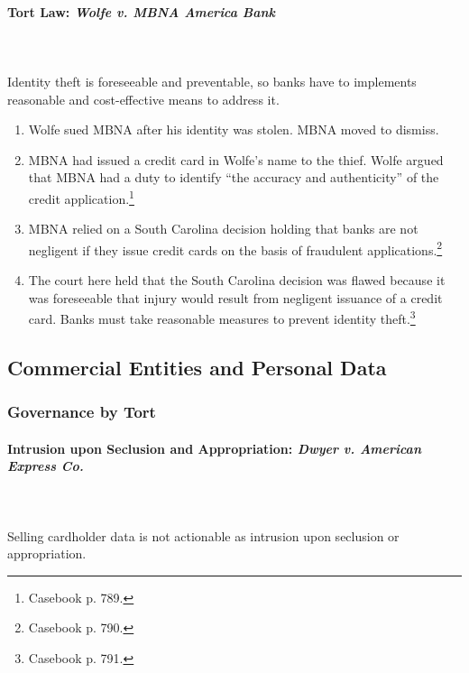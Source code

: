 \newpage %

\paragraph{Tort Law: \emph{Wolfe v. MBNA America Bank}}
~\\\\
Identity theft is foreseeable and preventable, so banks have to implements 
reasonable and cost-effective means to address it.

\begin{enumerate}
    \item Wolfe sued MBNA after his identity was stolen. MBNA moved to dismiss.
    \item MBNA had issued a credit card in Wolfe's name to the thief. Wolfe 
    argued that MBNA had a duty to identify ``the accuracy and authenticity'' of 
    the credit application.\footnote{Casebook p. 789.}
    \item MBNA relied on a South Carolina decision holding that banks are not 
    negligent if they issue credit cards on the basis of fraudulent 
    applications.\footnote{Casebook p. 790.}
    \item The court here held that the South Carolina decision was flawed 
    because it was foreseeable that injury would result from negligent issuance 
    of a credit card. Banks must take reasonable measures to prevent identity 
    theft.\footnote{Casebook p. 791.}
\end{enumerate}

\subsection{Commercial Entities and Personal Data}

\subsubsection{Governance by Tort}

\paragraph{Intrusion upon Seclusion and Appropriation: \emph{Dwyer v. American 
Express Co.}}
~\\\\
Selling cardholder data is not actionable as intrusion upon seclusion or 
appropriation.

